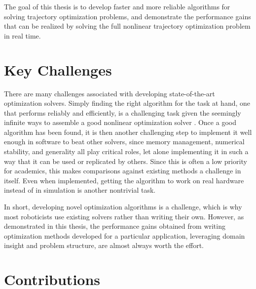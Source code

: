 \documentclass[../root.tex]{subfiles}
\begin{document}
The goal of this thesis is to develop faster and more reliable algorithms for
solving trajectory optimization problems, and demonstrate the performance
gains that can be realized by solving the full nonlinear trajectory
optimization problem in real time.

\section{Key Challenges} 

There are many challenges associated with developing state-of-the-art
optimization solvers. Simply finding the right algorithm for the task at
hand, one that performs reliably and efficiently, is a challenging task given
the seemingly infinite ways to assemble a good nonlinear optimization solver
\cite{nocedal_Numerical_2006}. Once a good algorithm has been found, it is
then another challenging step to implement it well enough in software to beat
other solvers, since memory management, numerical stability, and generality
all play critical roles, let alone implementing it in such a way that it can
be used or replicated by others. Since this is often a low priority for
academics, this makes comparisons against existing methods a challenge in
itself. Even when implemented, getting the algorithm to work on real
hardware instead of in simulation is another nontrivial task.

In short, developing novel optimization algorithms is a challenge, which is
why most roboticists use existing solvers rather than writing their own.
However, as demonstrated in this thesis, the performance gains obtained from
writing optimization methods developed for a particular application,
leveraging domain insight and problem structure, are almost always worth the
effort.

\section{Contributions}
\end{document}
